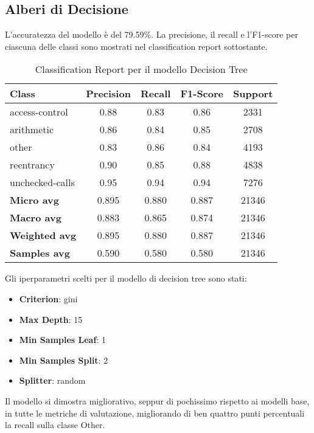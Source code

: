 \documentclass[../../Thesis.tex]{subfiles}
\begin{document}
\subsection{Alberi di Decisione}
L'accuratezza del modello è del 79.59\%. La precisione, il recall e l'F1-score per ciascuna delle classi sono mostrati nel classification report sottostante.

\begin{table}[H]
    \centering
    \small
    \begin{tabular}{lcccc}
    \hline
    \textbf{Class} & \textbf{Precision} & \textbf{Recall} & \textbf{F1-Score} & \textbf{Support} \\
    \hline
    access-control & 0.88 & 0.83 & 0.86 & 2331 \\
    arithmetic & 0.86 & 0.84 & 0.85 & 2708 \\
    other & 0.83 & 0.86 & 0.84 & 4193 \\
    reentrancy & 0.90 & 0.85 & 0.88 & 4838 \\
    unchecked-calls & 0.95 & 0.94 & 0.94 & 7276 \\
    \hline
    \textbf{Micro avg} & 0.895 & 0.880 & 0.887 & 21346 \\
    \textbf{Macro avg} & 0.883 & 0.865 & 0.874 & 21346 \\
    \textbf{Weighted avg} & 0.895 & 0.880 & 0.887 & 21346 \\
    \textbf{Samples avg} & 0.590 & 0.580 & 0.580 & 21346 \\
    \hline
    \end{tabular}
    \caption{Classification Report per il modello Decision Tree}
\end{table}
Gli iperparametri scelti per il modello di decision tree sono stati: 
\begin{itemize}
    \item \textbf{Criterion}: gini
    \item \textbf{Max Depth}: 15
    \item \textbf{Min Samples Leaf}: 1
    \item \textbf{Min Samples Split}: 2
    \item \textbf{Splitter}: random
\end{itemize}

Il modello si dimostra migliorativo, seppur di pochissimo rispetto ai modelli base, in tutte le metriche di valutazione, migliorando di ben quattro punti percentuali la recall sulla classe Other.\\
\end{document}
